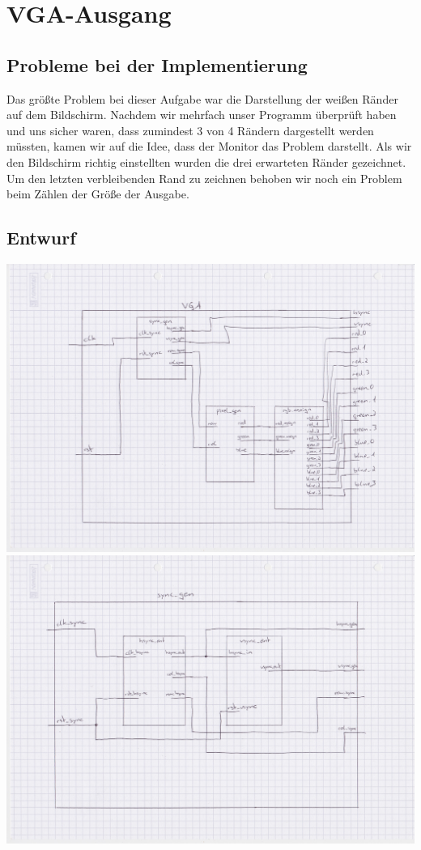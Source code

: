 \documentclass[parskip=full]{scrartcl}
\begin{document}
	\setcounter{section}{0}
	\section{VGA-Ausgang}
		\subsection{Probleme bei der Implementierung}
			Das größte Problem bei dieser Aufgabe war die Darstellung der weißen Ränder auf dem Bildschirm. Nachdem wir mehrfach unser Programm überprüft haben und uns sicher waren, dass zumindest 3 von 4 Rändern dargestellt werden müssten, kamen wir auf die Idee, dass der Monitor das Problem darstellt. Als wir den Bildschirm richtig einstellten wurden die drei erwarteten Ränder gezeichnet. Um den letzten verbleibenden Rand zu zeichnen behoben wir noch ein Problem beim Zählen der Größe der Ausgabe.
			
		\subsection{Entwurf}
			\includegraphics[scale=0.1]{Bilder/VGA.jpeg} \newline
			\includegraphics[scale=0.1]{Bilder/Sync_gen.jpeg} \newline
\end{document}
